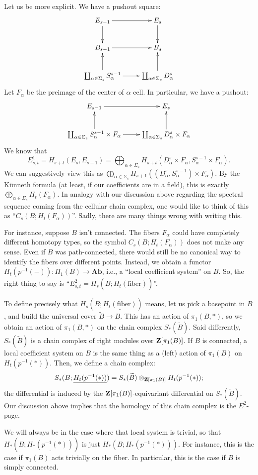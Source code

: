 Let us be more explicit. We have a pushout square:
\begin{equation*}
    \xymatrix{
	E_{s-1}\ar[r]\ar[d] & E_s\ar[d]\\
	B_{s-1}\ar[r] & B_s\\
	\coprod_{\alpha\in\Sigma_s}S^{s-1}_\alpha\ar[r]\ar[u] & \coprod_{\alpha\in\Sigma_s} D^s_\alpha\ar[u]
    }
\end{equation*}
Let $F_\alpha$ be the preimage of the center of $\alpha$ cell. In particular,
we have a pushout:
\begin{equation*}
    \xymatrix{
	E_{s-1}\ar[r] & E_s\\
	\coprod_{\alpha\in\Sigma_s} S^{s-1}_\alpha\times F_\alpha\ar[r]\ar[u] & \coprod_{\alpha\in\Sigma_s} D^s_\alpha \times F_\alpha\ar[u]
    }
\end{equation*}
We know that
$$E^1_{s,t} = H_{s+t}(E_s,E_{s-1}) = \bigoplus_{\alpha\in \Sigma_s}
H_{s+t}(D^s_\alpha\times F_\alpha, S^{s-1}_\alpha\times F_\alpha).$$
We can suggestively view this as $\bigoplus_{\alpha\in\Sigma_s}
H_{s+1}((D^s_\alpha, S^{s-1}_\alpha)\times F_\alpha)$. By the K\"unneth
formula (at least, if our coefficients are in a field), this is exactly
$\bigoplus_{\alpha\in\Sigma_s} H_t(F_\alpha)$. In analogy with our discussion
above regarding the spectral sequence coming from the cellular chain complex,
one would like to think of this as ``$C_s(B;H_t(F_\alpha))$''. Sadly, there are
many things wrong with writing this.

For instance, suppose $B$ isn't connected. The fibers $F_\alpha$ could have
completely different homotopy types, so the symbol $C_s(B;H_t(F_\alpha))$
does not make any sense. Even if $B$ was path-connected, there would still be
no canonical way to identify the fibers over different points. Instead, we
obtain a functor $H_t(p^{-1}(-)):\Pi_1(B) \to \mathbf{Ab}$, i.e., a ``local
coefficient system'' on $B$. So, the right thing to say is ``$E^2_{s,t} =
H_s(B;\underline{H_t(\mathrm{fiber})})$''.

To define precisely what $H_s(B;\underline{H_t(\mathrm{fiber})})$ means, let us
pick a basepoint in $B$, and build the universal cover $\widetilde{B}\to B$.
This has an action of $\pi_1(B,\ast)$, so we obtain an action of
$\pi_1(B,\ast)$ on the chain complex $S_\ast(\widetilde{B})$. Said differently,
$S_\ast(\widetilde{B})$ is a chain complex of right modules over
$\mathbf Z[\pi_1(B)]$. If $B$ is connected, a local coefficient system on $B$ is the
same thing as a (left) action of $\pi_1(B)$ on $H_t(p^{-1}(\ast))$. Then, we
define a chain complex:
$$
S_\ast(B;\underline{H_t(p^{-1}(\ast))}) = S_\ast(\widetilde{B})
\otimes_{\mathbf Z[\pi_1(B)]} H_t(p^{-1}(\ast));
$$
the differential is induced by the $\mathbf Z[\pi_1(B)]$-equivariant differential on
$S_\ast(\widetilde{B})$. Our discussion above implies that the homology of this
chain complex is the $E^2$-page.

We will always be in the case where that local system is trivial, so that
$H_\ast(B;\underline{H_\ast(p^{-1}(\ast))})$ is just
$H_\ast(B;H_\ast(p^{-1}(\ast)))$. For instance, this is the case if $\pi_1(B)$
acts trivially on the fiber. In particular, this is the case if $B$ is simply
connected. 
